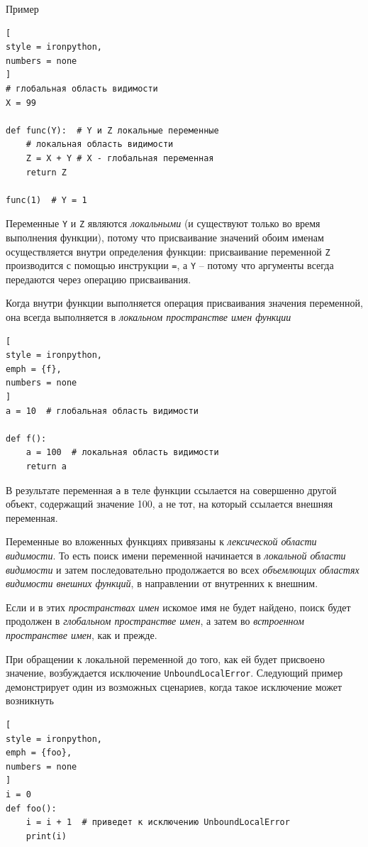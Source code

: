 \documentclass[%
	11pt,
	a4paper,
	utf8,
		]{article}
\begin{document}
Пример

\begin{lstlisting}[
style = ironpython,
numbers = none
]
# глобальная область видимости
X = 99  

def func(Y):  # Y и Z локальные переменные
    # локальная область видимости
    Z = X + Y # X - глобальная переменная
    return Z
    
func(1)  # Y = 1
\end{lstlisting}

Переменные \texttt{Y} и \texttt{Z} являются \emph{локальными} (и существуют только во время выполнения функции), потому что присваивание значений обоим именам осуществляется внутри определения функции: присваивание переменной \texttt{Z} производится с помощью инструкции \texttt{=}, а \texttt{Y} -- потому что аргументы всегда передаются через операцию присваивания.

Когда внутри функции выполняется операция присваивания значения переменной, она всегда выполняется в \emph{локальном пространстве имен функции}

\begin{lstlisting}[
style = ironpython,
emph = {f},
numbers = none
]
a = 10  # глобальная область видимости

def f():
    a = 100  # локальная область видимости
    return a
\end{lstlisting}

В результате переменная \texttt{a} в теле функции ссылается на совершенно другой объект, содержащий значение 100, а не тот, на который ссылается внешняя переменная.

Переменные во вложенных функциях привязаны к \emph{лексической области видимости}. То есть поиск имени переменной начинается в \emph{локальной области видимости} и затем последовательно продолжается во всех \emph{объемлющих областях видимости внешних функций}, в направлении от внутренних к внешним.

Если и в этих \emph{пространствах имен} искомое имя не будет найдено, поиск будет продолжен в \emph{глобальном пространстве имен}, а затем во \emph{встроенном пространстве имен}, как и прежде.

При обращении к локальной переменной до того, как ей будет присвоено значение, возбуждается исключение \texttt{UnboundLocalError}. Следующий пример демонстрирует один из возможных сценариев, когда такое исключение может возникнуть

\begin{lstlisting}[
style = ironpython,
emph = {foo},
numbers = none
]
i = 0
def foo():
    i = i + 1  # приведет к исключению UnboundLocalError
    print(i)
\end{lstlisting}
\end{document}
